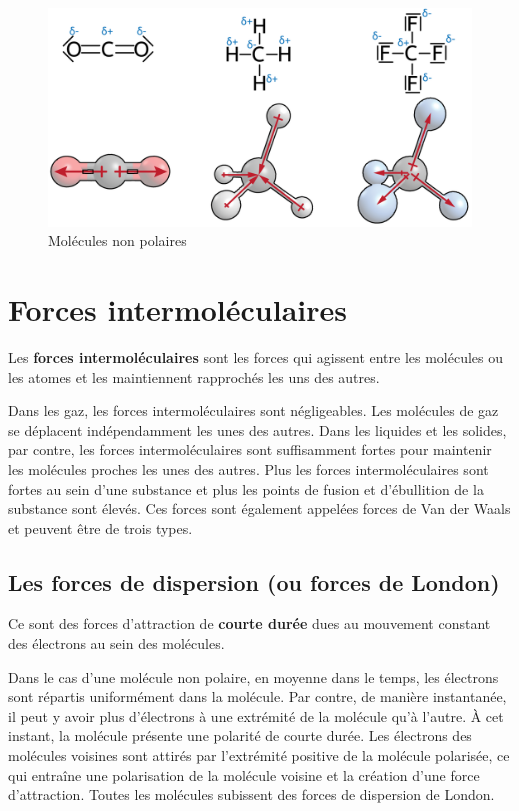 \documentclass[
  11pt,
  french,
  a4paper,
  openany]{book}
\begin{document}
\begin{figure}

{\centering \includegraphics[width=0.5\linewidth]{images/dipole-4} 

}

\caption{Molécules non polaires}\label{fig:dipole-4}
\end{figure}

\hypertarget{forces-intermoluxe9culaires}{%
\section{Forces intermoléculaires}\label{forces-intermoluxe9culaires}}

Les \textbf{forces intermoléculaires} sont les forces qui agissent entre les molécules ou les atomes et les maintiennent rapprochés les uns des autres.

Dans les gaz, les forces intermoléculaires sont négligeables. Les molécules de gaz se déplacent indépendamment les unes des autres. Dans les liquides et les solides, par contre, les forces intermoléculaires sont suffisamment fortes pour maintenir les molécules proches les unes des autres. Plus les forces intermoléculaires sont fortes au sein d'une substance et plus les points de fusion et d'ébullition de la substance sont élevés. Ces forces sont également appelées forces de Van der Waals et peuvent être de trois types.

\hypertarget{les-forces-de-dispersion-ou-forces-de-london}{%
\subsection{Les forces de dispersion (ou forces de London)}\label{les-forces-de-dispersion-ou-forces-de-london}}

Ce sont des forces d'attraction de \textbf{courte durée} dues au mouvement constant des électrons au sein des molécules.

Dans le cas d'une molécule non polaire, en moyenne dans le temps, les électrons sont répartis uniformément dans la molécule. Par contre, de manière instantanée, il peut y avoir plus d'électrons à une extrémité de la molécule qu'à l'autre. À cet instant, la molécule présente une polarité de courte durée. Les électrons des molécules voisines sont attirés par l'extrémité positive de la molécule polarisée, ce qui entraîne une polarisation de la molécule voisine et la création d'une force d'attraction. Toutes les molécules subissent des forces de dispersion de London.
\end{document}
